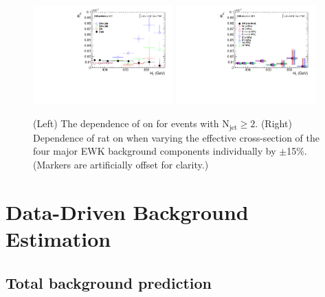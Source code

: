 \begin{figure}[h]
  \begin{center}
    \includegraphics[width = 0.48\textwidth]{Figures/Analysis/PAS/Ratio_Multi2Incl_AlphaT55.pdf}
    \includegraphics[width = 0.48\textwidth]{Figures/Analysis/PAS/Syst_Multi2Incl_AlphaT55.pdf}
    \caption{\label{fig:rat_vs_ht} (Left) The dependence of \RaT on
      \HT for events with N$_{\mathrm{jet}} \geq 2$. (Right) Dependence of rat on
      \HT when varying the effective cross-section of the four major
      EWK background components individually by $\pm$15\%. (Markers
      are artificially offset for clarity.)  }
  \end{center}
\end{figure}






\section{Data-Driven Background Estimation}
\subsection{Total background prediction}
